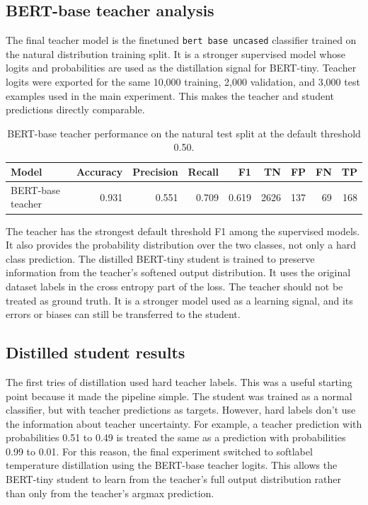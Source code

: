 \documentclass[pdflatex,sn-mathphys-num]{sn-jnl}
\begin{document}
\subsection{BERT-base teacher analysis}

The final teacher model is the finetuned \texttt{bert base uncased} classifier trained on the natural distribution training split.
It is a stronger supervised model whose logits and probabilities are used as the distillation signal for BERT-tiny.
Teacher logits were exported for the same 10,000 training, 2,000 validation, and 3,000 test examples used in the main experiment.
This makes the teacher and student predictions directly comparable.

\begin{table}[htbp]
\caption{BERT-base teacher performance on the natural test split at the default threshold 0.50.}
\label{tab:bert-base-teacher-summary}
\centering
\begin{tabular}{lrrrrrrrr}
\toprule
Model & Accuracy & Precision & Recall & F1 & TN & FP & FN & TP \\
\midrule
BERT-base teacher & 0.931 & 0.551 & 0.709 & 0.619 & 2626 & 137 & 69 & 168 \\
\bottomrule
\end{tabular}
\end{table}

The teacher has the strongest default threshold F1 among the supervised models.
It also provides the probability distribution over the two classes, not only a hard class prediction.
The distilled BERT-tiny student is trained to preserve information from the teacher's softened output distribution.
It uses the original dataset labels in the cross entropy part of the loss.
The teacher should not be treated as ground truth.
It is a stronger model used as a learning signal, and its errors or biases can still be transferred to the student.

\subsection{Distilled student results}

The first tries of distillation used hard teacher labels.
This was a useful starting point because it made the pipeline simple.
The student was trained as a normal classifier, but with teacher predictions as targets.
However, hard labels don't use the information about teacher uncertainty.
For example, a teacher prediction with probabilities 0.51 to 0.49 is treated the same as a prediction with probabilities 0.99 to 0.01.
For this reason, the final experiment switched to softlabel temperature distillation using the BERT-base teacher logits.
This allows the BERT-tiny student to learn from the teacher's full output distribution rather than only from the teacher's argmax prediction.
\end{document}
